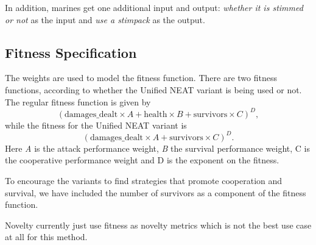 In addition, marines get one additional input and output:
\emph{whether it is stimmed or not} as the input and \emph{use a
  stimpack} as the output.

\subsection{Fitness Specification}

The weights are used to model the fitness function. There are two
fitness functions, according to whether the Unified NEAT variant is
being used or not.  The regular fitness function is given by
\begin{equation*}
  (\text{damages\_dealt} \times A + \text{health} \times B + \text{survivors} \times C)^D,
\end{equation*}
while the fitness for the Unified NEAT variant is
\begin{equation*}
  (\text{damages\_dealt} \times A + \text{survivors} \times C)^D.
\end{equation*}
Here \emph{A} is the attack performance weight, \emph{B} the survival
performance weight, C is the cooperative performance weight and D is
the exponent on the fitness.

To encourage the variants to find strategies that promote cooperation
and survival, we have included the number of survivors as a component
of the fitness function.

Novelty currently just use fitness as novelty metrics which is not
the best use case at all for this method.

